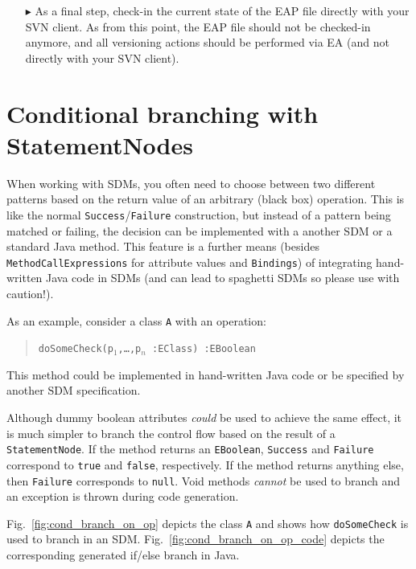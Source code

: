\begin{enumerate}
\item[$\blacktriangleright$] As a final step, check-in the current state of the EAP file directly with your SVN client. 
As from this point, the EAP file should not be checked-in anymore, and all versioning actions should be performed via EA (and not directly with your SVN client).
\end{enumerate}

\section{Conditional branching with StatementNodes}

When working with SDMs, you often need to choose between two different patterns based on the return value of an arbitrary (black box) operation.
This is like the normal \texttt{Success}/\texttt{Failure} construction, but instead of a pattern being matched or failing, the decision can be implemented with a another SDM or a standard Java method.
This feature is a further means (besides \texttt{MethodCallExpressions} for attribute values and \texttt{Bindings}) of integrating hand-written Java code in SDMs (and can lead to spaghetti SDMs so please use with caution!). 

As an example, consider a class \texttt{A} with an operation:
\begin{quote}
 \mbox{\texttt{doSomeCheck(p$_1$,\ldots,p$_n$ :EClass) :EBoolean}}
\end{quote}

This method could be implemented in hand-written Java code or be specified by another SDM specification.

Although dummy boolean attributes \emph{could} be used to achieve the same effect, it is much simpler to branch the control flow based on the result of a \texttt{StatementNode}.
If the method returns an \texttt{EBoolean}, \texttt{Success} and \texttt{Failure} correspond to \texttt{true} and \texttt{false}, respectively.
If the method returns anything else, then \texttt{Failure} corresponds to \texttt{null}.
Void methods \emph{cannot} be used to branch and an exception is thrown during code generation.

Fig.~\ref{fig:cond_branch_on_op} depicts the class \texttt{A} and shows how \texttt{doSomeCheck} is used to branch in an SDM.
Fig.~\ref{fig:cond_branch_on_op_code} depicts the corresponding generated if/else branch in Java. 

